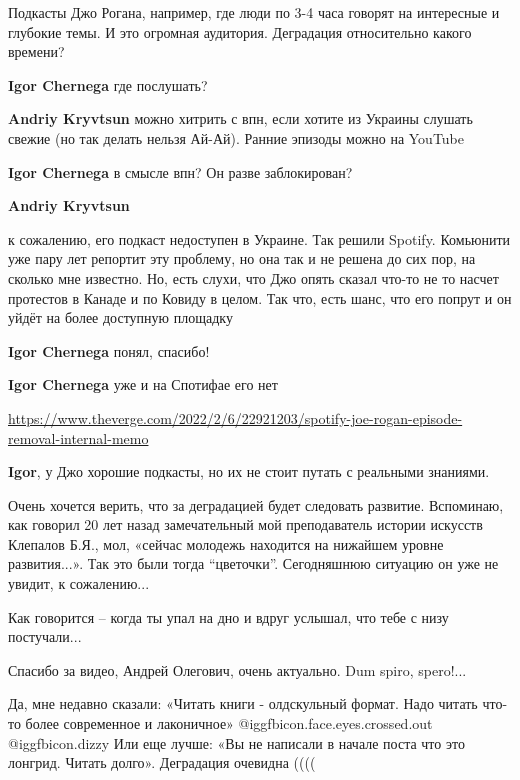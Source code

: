 \begin{itemize}

Подкасты Джо Рогана, например, где люди по 3-4 часа говорят на интересные и
глубокие темы. И это огромная аудитория. Деградация относительно какого
времени?

\begin{itemize} %
\textbf{Igor Chernega} где послушать?

\textbf{Andriy Kryvtsun} можно хитрить с впн, если хотите из Украины слушать свежие (но так делать нельзя Ай-Ай). Ранние эпизоды можно на YouTube

\textbf{Igor Chernega} в смысле впн? Он разве заблокирован?

\textbf{Andriy Kryvtsun} 

к сожалению, его подкаст недоступен в Украине. Так решили Spotify. Комьюнити
уже пару лет репортит эту проблему, но она так и не решена до сих пор, на
сколько мне известно. Но, есть слухи, что Джо опять сказал что-то не то насчет
протестов в Канаде и по Ковиду в целом. Так что, есть шанс, что его попрут и он
уйдёт на более доступную площадку

\textbf{Igor Chernega} понял, спасибо!

\textbf{Igor Chernega} уже и на Спотифае его нет

\url{https://www.theverge.com/2022/2/6/22921203/spotify-joe-rogan-episode-removal-internal-memo}

\textbf{Igor}, у Джо хорошие подкасты, но их не стоит путать с реальными знаниями.

\end{itemize} %


Очень хочется верить, что за деградацией будет следовать развитие. Вспоминаю,
как говорил 20 лет назад замечательный мой преподаватель истории искусств
Клепалов Б.Я., мол, «сейчас молодежь находится на нижайшем уровне развития...».
Так это были тогда \enquote{цветочки}. Сегодняшнюю ситуацию он уже не увидит, к
сожалению...

Как говорится – когда ты упал на дно и вдруг услышал, что тебе с низу
постучали...

Спасибо за видео, Андрей Олегович, очень актуально. Dum spiro, spero!...


Да, мне недавно сказали: «Читать книги - олдскульный формат. Надо читать что-то
более современное и лаконичное»  @igg{fbicon.face.eyes.crossed.out}
@igg{fbicon.dizzy}  Или еще лучше: «Вы не написали в начале поста что это
лонгрид. Читать долго». Деградация очевидна ((((


\end{itemize}
